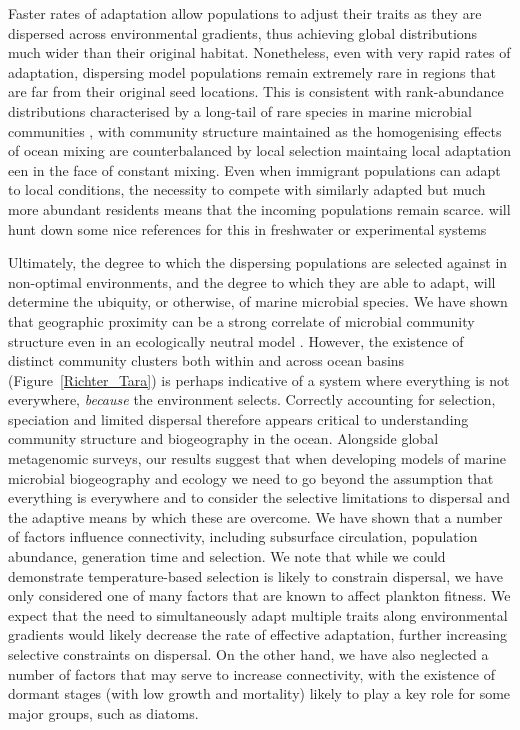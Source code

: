 \documentclass[12pt]{article}
\newcommand{\sinead}[1]{{\color{green} #1}}
\begin{document}
Faster rates of adaptation allow populations to adjust their traits as they are dispersed across environmental gradients, thus achieving global distributions much wider than their original habitat. Nonetheless, even with very rapid rates of adaptation, dispersing model populations remain extremely rare in regions that are far from their original seed locations. This is consistent with rank-abundance distributions characterised by a long-tail of rare species in marine microbial communities \citep{Ser-Giacomi:2018aa}, with community structure maintained as the homogenising effects of ocean mixing are counterbalanced by local selection\sinead{maintaing local adaptation een in the face of constant mixing}. Even when immigrant populations can adapt to local conditions, the necessity to compete with similarly adapted but much more abundant residents means that the incoming populations remain scarce. \sinead{will hunt down some nice references for this in freshwater or experimental systems}

Ultimately, the degree to which the dispersing populations are selected against in non-optimal environments, and the degree to which they are able to adapt, will determine the ubiquity, or otherwise, of marine microbial species. We have shown that geographic proximity can be a strong correlate of microbial community structure even in an ecologically neutral model \citep{Hellweger:2014}. However, the existence of distinct community clusters both within and across ocean basins (Figure~\ref{Richter_Tara}) is perhaps indicative of a system where everything is not everywhere, \textit{because} the environment selects. Correctly accounting for selection, speciation and limited dispersal therefore appears critical to understanding community structure and biogeography in the ocean. Alongside global metagenomic surveys, our results suggest that when developing models of marine microbial biogeography and ecology we need to go beyond the assumption that everything is everywhere and to consider the selective limitations to dispersal and the adaptive means by which these are overcome. We have shown that a number of factors influence connectivity, including subsurface circulation, population abundance, generation time and selection. We note that while we could demonstrate temperature-based selection is likely to constrain dispersal, we have only considered one of many factors that are known to affect plankton fitness. We expect that the need to simultaneously adapt multiple traits along environmental gradients would likely decrease the rate of effective adaptation, further increasing selective constraints on dispersal. On the other hand, we have also neglected a number of factors that may serve to increase connectivity, with the existence of dormant stages (with low growth and mortality) likely to play a key role for some major groups, such as diatoms. 
\end{document}
